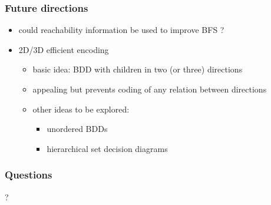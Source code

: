 \documentclass{beamer}
\begin{document}
\begin{frame}
  \frametitle{Future directions}

  \begin{itemize}
  \item could reachability information be used to improve BFS ?
  \item 2D/3D efficient encoding
    \begin{itemize}
    \item basic idea: BDD with children in two (or three) directions
    \item appealing but prevents coding of any relation between directions
    \item other ideas to be explored:
      \begin{itemize}
      \item unordered BDDs
      \item hierarchical set decision diagrams
      \end{itemize}
    \end{itemize}
  \end{itemize}
\end{frame}


\appendix

\begin{frame}
  \frametitle{Questions}

  \begin{center}
    {\Huge ?}
  \end{center}
\end{frame}
\end{document}
